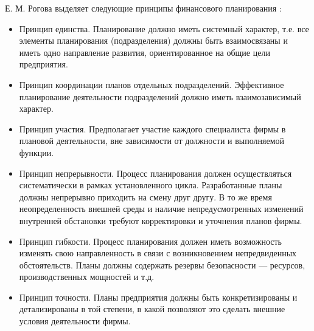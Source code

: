 Е. М. Рогова выделяет следующие принципы финансового планирования \cite[70--72]{rogova}:
\begin{itemize}
	\item Принцип единства.
	Планирование должно иметь системный характер, т.е. все элементы планирования (подразделения) должны быть взаимосвязаны и иметь одно направление развития, ориентированное на общие цели предприятия.
	\item Принцип координации планов отдельных подразделений.
	Эффективное планирование деятельности подразделений должно иметь взаимозависимый характер.
	\item Принцип участия.
	Предполагает участие каждого специалиста фирмы в плановой деятельности, вне зависимости от должности и выполняемой функции.
	\item Принцип непрерывности.
	Процесс планирования должен осуществляться систематически в рамках установленного цикла.
	Разработанные планы должны непрерывно приходить на смену друг другу.
	В то же время неопределенность внешней среды и наличие непредусмотренных изменений внутренней обстановки требуют корректировки и уточнения планов фирмы.
	\item Принцип гибкости.
	Процесс планирования должен иметь возможность изменять свою направленность в связи с возникновением непредвиденных обстоятельств.
	Планы должны содержать резервы безопасности --- ресурсов, производственных мощностей и т.д.
	\item Принцип точности.
	Планы предприятия должны быть конкретизированы и детализированы в той степени, в какой позволяют это сделать внешние условия деятельности фирмы.
\end{itemize}















